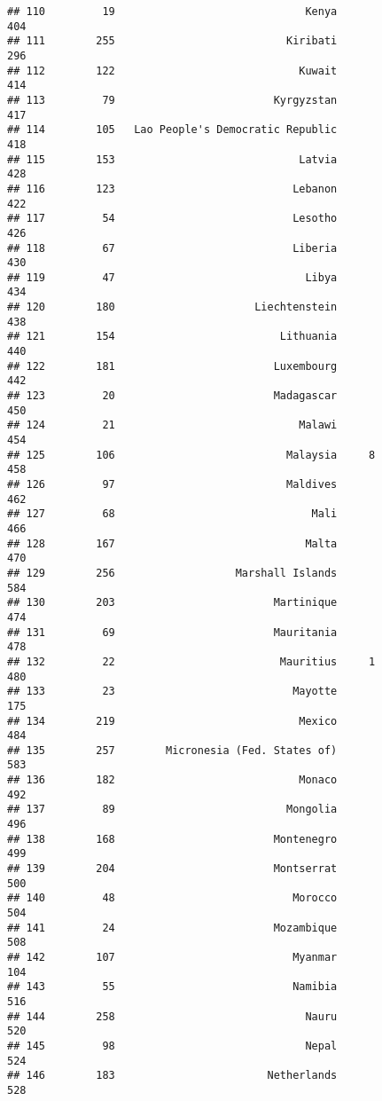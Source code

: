 \documentclass[]{article}
\begin{document}
\begin{verbatim}
## 110         19                              Kenya                404
## 111        255                           Kiribati                296
## 112        122                             Kuwait                414
## 113         79                         Kyrgyzstan                417
## 114        105   Lao People's Democratic Republic                418
## 115        153                             Latvia                428
## 116        123                            Lebanon                422
## 117         54                            Lesotho                426
## 118         67                            Liberia                430
## 119         47                              Libya                434
## 120        180                      Liechtenstein                438
## 121        154                          Lithuania                440
## 122        181                         Luxembourg                442
## 123         20                         Madagascar                450
## 124         21                             Malawi                454
## 125        106                           Malaysia     8          458
## 126         97                           Maldives                462
## 127         68                               Mali                466
## 128        167                              Malta                470
## 129        256                   Marshall Islands                584
## 130        203                         Martinique                474
## 131         69                         Mauritania                478
## 132         22                          Mauritius     1          480
## 133         23                            Mayotte                175
## 134        219                             Mexico                484
## 135        257        Micronesia (Fed. States of)                583
## 136        182                             Monaco                492
## 137         89                           Mongolia                496
## 138        168                         Montenegro                499
## 139        204                         Montserrat                500
## 140         48                            Morocco                504
## 141         24                         Mozambique                508
## 142        107                            Myanmar                104
## 143         55                            Namibia                516
## 144        258                              Nauru                520
## 145         98                              Nepal                524
## 146        183                        Netherlands                528

\end{verbatim}
\end{document}
